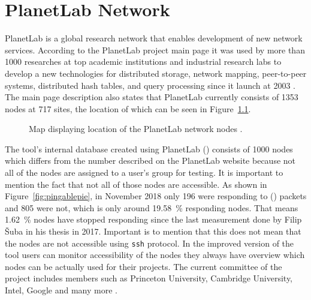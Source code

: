 \chapter{PlanetLab Network}
\label{chapter:planetlabnetwork}
PlanetLab is a global research network that enables development of new network services. According to the PlanetLab project main page it was used by more than 1000 researches at top academic institutions and industrial research labs to develop a new technologies for distributed storage, network mapping, peer-to-peer systems, distributed hash tables, and query processing since it launch at 2003 \cite{planetlabmain}. The main page description also states that PlanetLab currently consists of 1353 nodes at 717 sites, the location of which can be seen in Figure~\ref{fig:location}.

\begin{figure}[H]
	\centering
	\caption{Map displaying location of the PlanetLab network nodes \cite{OpenStreetMap}.}
	\label{fig:location}
\end{figure}

The tool's internal database created using PlanetLab  () consists of 1000 nodes which differs from the number described on the PlanetLab website because not all of the nodes are assigned to a user's group for testing. It is important to mention the fact that not all of those nodes are accessible. As shown in Figure~\ref{fig:pingablepie}, in November 2018  only 196 were responding to  () packets and 805 were not, which is only around \SI{19.58}{\percent} responding nodes. That means \SI{1.62}{\percent} nodes have stopped responding since the last measurement done by Filip Šuba in his thesis \cite{suba1} in 2017. Important is to mention that this does not mean that the nodes are not accessible using \texttt{ssh} protocol. In the improved version of the tool users can monitor accessibility of the nodes they always have overview which nodes can be actually used for their projects. The current committee of the project includes members such as Princeton University, Cambridge University, Intel, Google and many more \cite{planetlabmain}.\\

